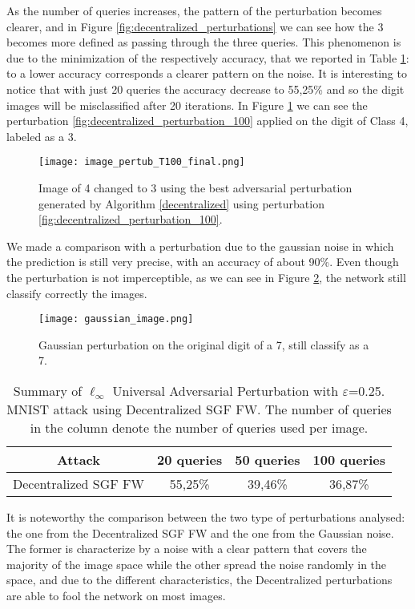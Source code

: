 As the number of queries increases, the pattern of the perturbation becomes clearer, and in Figure \ref{fig:decentralized_perturbations} we can see how the 3 becomes more defined as passing through the three queries. This phenomenon is due to the minimization of the respectively accuracy, that we reported in Table \ref{tab:decentralized}: to a lower accuracy corresponds a clearer pattern on the noise. It is interesting to notice that with just 20 queries the accuracy decrease to 55,25\% and so the digit images will be misclassified after 20 iterations. In Figure \ref{fig:decentralized} we can see the perturbation \ref{fig:decentralized_perturbation_100} applied on the digit of Class 4, labeled as a 3.

\begin{figure}[htbp]
	\centering
	\texttt{[image: image\_pertub\_T100\_final.png]}
	\caption{{\small Image of 4 changed to 3 using the best adversarial perturbation generated by Algorithm \ref{decentralized} using perturbation \ref{fig:decentralized_perturbation_100}.}}
	\label{fig:decentralized}
\end{figure}

We made a comparison with a perturbation due to the gaussian noise in which the prediction is still very precise, with an accuracy of about 90\%. Even though the perturbation is not imperceptible, as we can see in Figure \ref{fig:gaussian_noise}, the network still classify correctly the images.

\begin{figure}[htbp]
	\centering
	\texttt{[image: gaussian\_image.png]}
	\caption{{\small Gaussian perturbation on the original digit of a 7, still classify as a 7.}}
	\label{fig:gaussian_noise}
\end{figure}

\begin{table}[htbp]
	\begin{center}
		\begin{adjustwidth}{-.6cm}{}
			\begin{tabular}{c|ccc}
				\textbf{Attack} &          20 \textbf{queries} &      50 \textbf{queries} &     100 \textbf{queries} \\
				\midrule
				{\small Decentralized SGF FW}     &    55,25\% &    39,46\% &       36,87\% \\
			\end{tabular}
		\end{adjustwidth}
	\end{center}
	\caption{{\small Summary of $\ell_\infty$ Universal Adversarial Perturbation with $\varepsilon$=0.25. MNIST attack using Decentralized SGF FW. The number of queries in the column denote the number of queries used per image.}}
	\label{tab:decentralized}
\end{table}

It is noteworthy the comparison between the two type of perturbations analysed: the one from the Decentralized SGF FW and the one from the Gaussian noise. The former is characterize by a noise with a clear pattern that covers the majority of the image space while the other spread the noise randomly in the space, and due to the different characteristics, the Decentralized perturbations are able to fool the network on most images.